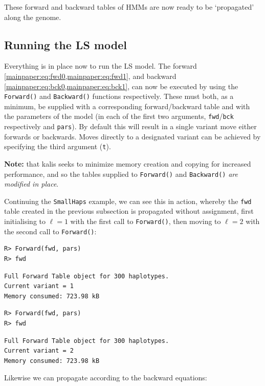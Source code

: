 \documentclass[a4paper]{article}
\newcommand{\pkg}[1]{{\fontseries{m}\fontseries{b}\selectfont #1}}
\begin{document}
These forward and backward tables of HMMs are now ready to be `propagated' along the genome.



\subsection*{Running the LS model}
\label{sec:runningls}

Everything is in place now to run the LS model.
The forward \cref{mainpaper:eq:fwd0,mainpaper:eq:fwd1}, and backward \cref{mainpaper:eq:bck0,mainpaper:eq:bck1}, can now be executed by using the \texttt{Forward()} and \texttt{Backward()} functions respectively.
These must both, as a minimum, be supplied with a corresponding forward/backward table and with the parameters of the model (in each of the first two arguments, \texttt{fwd}/\texttt{bck} respectively and \texttt{pars}).
By default this will result in a single variant move either forwards or backwards.
Moves directly to a designated variant can be achieved by specifying the third argument (\texttt{t}).

\textbf{Note:} that \pkg{kalis} seeks to minimize memory creation and copying for increased performance, and so the tables supplied to \texttt{Forward()} and \texttt{Backward()} \emph{are modified in place}.

Continuing the \texttt{SmallHaps} example, we can see this in action, whereby the \texttt{fwd} table created in the previous subsection is propagated without assignment, first initialising to \(\ell=1\) with the first call to \texttt{Forward()}, then moving to \(\ell=2\) with the second call to \texttt{Forward()}:

\begin{verbatim}
R> Forward(fwd, pars)
R> fwd
\end{verbatim}
\begin{verbatim}
Full Forward Table object for 300 haplotypes.
Current variant = 1
Memory consumed: 723.98 kB
\end{verbatim}
\begin{verbatim}
R> Forward(fwd, pars)
R> fwd
\end{verbatim}
\begin{verbatim}
Full Forward Table object for 300 haplotypes.
Current variant = 2
Memory consumed: 723.98 kB
\end{verbatim}

Likewise we can propagate according to the backward equations:
\end{document}
